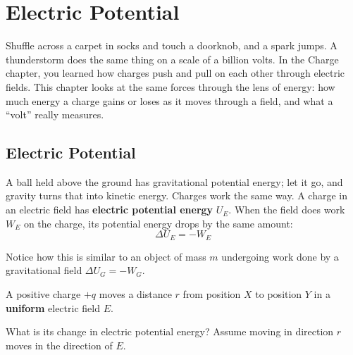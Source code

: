 \chapter{Electric Potential}

Shuffle across a carpet in socks and touch a doorknob, and a spark jumps. A thunderstorm does the same thing
on a scale of a billion volts. In the Charge chapter, you learned how charges push and pull
on each other through electric fields. This chapter looks at the same forces through the lens of energy: how
much energy a charge gains or loses as it moves through a field, and what a ``volt'' really measures.

\section{Electric Potential}
A ball held above the ground has gravitational potential energy; let it
go, and gravity turns that into kinetic energy. Charges work the same way.
A charge in an electric field has \textbf{electric potential
energy} $U_E$. When the field does work
$W_E$ on the charge, its potential energy drops by the same amount:
\begin{equation}
	\Delta U_E = -W_E \label{eq:change_in_epe}
\end{equation}

Notice how this is similar to an object of mass $m$ undergoing work done by a gravitational field $\Delta U_G = -W_G$.

\begin{Exercise}[title={Change in Electric Potential Energy}, label={eq:electric_potential_energy}]

A positive charge $+q$ moves a distance $r$ from position $X$ to position $Y$ in a \textbf{uniform} electric field $E$.



What is its change in electric potential energy? Assume moving in direction $r$ moves in the direction of $E$.
\end{Exercise}

